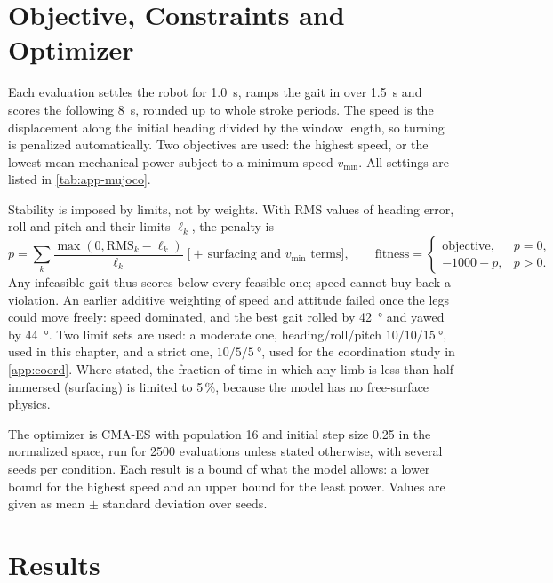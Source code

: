 \section{Objective, Constraints and Optimizer}
\label{sec:mj-objective}

Each evaluation settles the robot for \SI{1.0}{\second}, ramps the gait in over \SI{1.5}{\second} and scores the
following \SI{8}{\second}, rounded up to whole stroke periods. The speed is the displacement along the initial
heading divided by the window length, so turning is penalized automatically. Two objectives are used: the
highest speed, or the lowest mean mechanical power subject to a minimum speed $v_\text{min}$. All settings are listed in \cref{tab:app-mujoco}.

Stability is imposed by limits, not by weights. With RMS values of heading error, roll and pitch and their
limits $\ell_k$, the penalty is
\begin{equation}
  p = \sum_k \frac{\max(0,\mathrm{RMS}_k-\ell_k)}{\ell_k}
    \;\big[+\,\text{surfacing and } v_\text{min} \text{ terms}\big], \qquad
  \text{fitness} = \begin{cases} \text{objective}, & p=0,\\ -1000-p, & p>0. \end{cases}
  \label{eq:feasibility}
\end{equation}
Any infeasible gait thus scores below every feasible one; speed cannot buy back a violation. An earlier
additive weighting of speed and attitude failed once the legs could move freely: speed dominated, and the best
gait rolled by \SI{42}{\degree} and yawed by \SI{44}{\degree}. Two limit sets are used: a moderate one,
heading/roll/pitch $10/10/\SI{15}{\degree}$, used in this chapter, and a strict one, $10/5/\SI{5}{\degree}$, used for the
coordination study in \cref{app:coord}. Where stated, the
fraction of time in which any limb is less than half immersed (surfacing) is limited to 5\,\%, because the
model has no free-surface physics.

The optimizer is CMA-ES with population 16 and initial step size 0.25 in the normalized space, run for 2500
evaluations unless stated otherwise, with several seeds per condition. Each result is a bound of what the model
allows: a lower bound for the highest speed and an upper bound for the least power. Values are given as mean
$\pm$ standard deviation over seeds.

\section{Results}
\label{sec:mj-results}

